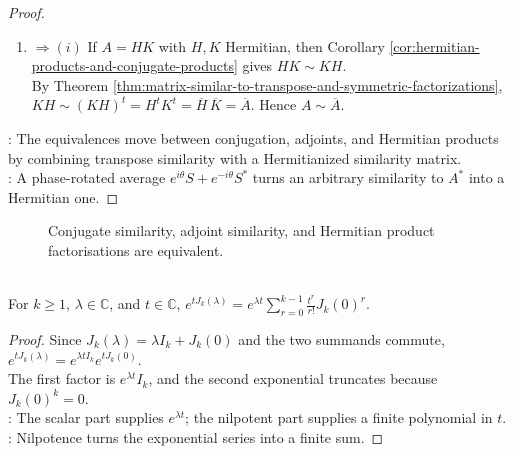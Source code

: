 \begin{theorem}
\begin{proof}
\begin{enumerate}[label=\roman*.]
\item[$(v)$]$\Rightarrow(i)$ If $A=HK$ with $H,K$ Hermitian, then Corollary \ref{cor:hermitian-products-and-conjugate-products} gives $HK\sim KH$.\\
By Theorem \ref{thm:matrix-similar-to-transpose-and-symmetric-factorizations}, $KH\sim (KH)^t=H^tK^t=\overline{H}\,\overline{K}=\overline{A}$. Hence $A\sim\overline{A}$.
\end{enumerate}
: The equivalences move between conjugation, adjoints, and Hermitian products by combining transpose similarity with a Hermitianized similarity matrix.\\
: A phase-rotated average $e^{i\theta}S+e^{-i\theta}S^*$ turns an arbitrary similarity to $A^*$ into a Hermitian one.
\end{proof}
\end{theorem}

\begin{figure}[H]
  \centering
  
  \caption{Conjugate similarity, adjoint similarity, and Hermitian product factorisations are equivalent.}
  \label{fig:conjugate-similarity-hermitian-products}
\end{figure}

\begin{proposition} \label{prop:exponential-of-jordan-block} \\
For $k\geq1$, $\lambda\in\mathbb{C}$, and $t\in\mathbb{C}$, $e^{tJ_k(\lambda)} =e^{\lambda t}\sum\limits_{r=0}^{k-1}\frac{t^r}{r!}J_k(0)^r$.
\begin{proof}
Since $J_k(\lambda)=\lambda I_k+J_k(0)$ and the two summands commute, $e^{tJ_k(\lambda)}=e^{\lambda tI_k}e^{tJ_k(0)}$.\\
The first factor is $e^{\lambda t}I_k$, and the second exponential truncates because $J_k(0)^k=0$.\\
: The scalar part supplies $e^{\lambda t}$; the nilpotent part supplies a finite polynomial in $t$.\\
: Nilpotence turns the exponential series into a finite sum.
\end{proof}
\end{proposition}


